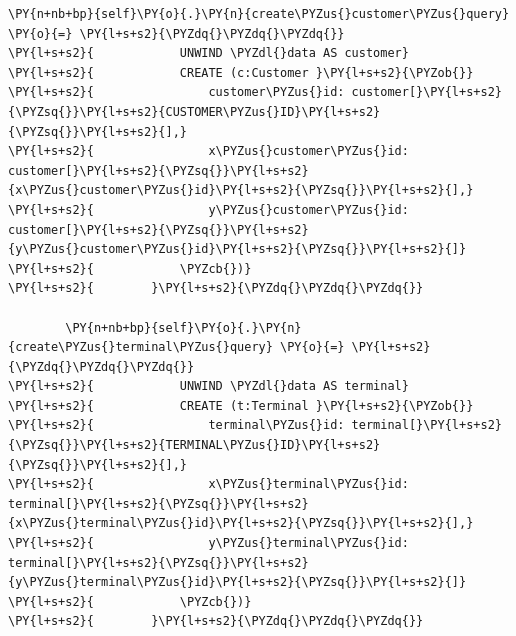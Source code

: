 \begin{tcolorbox}[breakable, size=fbox, boxrule=1pt, pad at break*=1mm,colback=cellbackground, colframe=cellborder]
\begin{Verbatim}[commandchars=\\\{\}]
        \PY{n+nb+bp}{self}\PY{o}{.}\PY{n}{create\PYZus{}customer\PYZus{}query} \PY{o}{=} \PY{l+s+s2}{\PYZdq{}\PYZdq{}\PYZdq{}}
\PY{l+s+s2}{            UNWIND \PYZdl{}data AS customer}
\PY{l+s+s2}{            CREATE (c:Customer }\PY{l+s+s2}{\PYZob{}}
\PY{l+s+s2}{                customer\PYZus{}id: customer[}\PY{l+s+s2}{\PYZsq{}}\PY{l+s+s2}{CUSTOMER\PYZus{}ID}\PY{l+s+s2}{\PYZsq{}}\PY{l+s+s2}{],}
\PY{l+s+s2}{                x\PYZus{}customer\PYZus{}id: customer[}\PY{l+s+s2}{\PYZsq{}}\PY{l+s+s2}{x\PYZus{}customer\PYZus{}id}\PY{l+s+s2}{\PYZsq{}}\PY{l+s+s2}{],}
\PY{l+s+s2}{                y\PYZus{}customer\PYZus{}id: customer[}\PY{l+s+s2}{\PYZsq{}}\PY{l+s+s2}{y\PYZus{}customer\PYZus{}id}\PY{l+s+s2}{\PYZsq{}}\PY{l+s+s2}{]}
\PY{l+s+s2}{            \PYZcb{})}
\PY{l+s+s2}{        }\PY{l+s+s2}{\PYZdq{}\PYZdq{}\PYZdq{}}
        
        \PY{n+nb+bp}{self}\PY{o}{.}\PY{n}{create\PYZus{}terminal\PYZus{}query} \PY{o}{=} \PY{l+s+s2}{\PYZdq{}\PYZdq{}\PYZdq{}}
\PY{l+s+s2}{            UNWIND \PYZdl{}data AS terminal}
\PY{l+s+s2}{            CREATE (t:Terminal }\PY{l+s+s2}{\PYZob{}}
\PY{l+s+s2}{                terminal\PYZus{}id: terminal[}\PY{l+s+s2}{\PYZsq{}}\PY{l+s+s2}{TERMINAL\PYZus{}ID}\PY{l+s+s2}{\PYZsq{}}\PY{l+s+s2}{],}
\PY{l+s+s2}{                x\PYZus{}terminal\PYZus{}id: terminal[}\PY{l+s+s2}{\PYZsq{}}\PY{l+s+s2}{x\PYZus{}terminal\PYZus{}id}\PY{l+s+s2}{\PYZsq{}}\PY{l+s+s2}{],}
\PY{l+s+s2}{                y\PYZus{}terminal\PYZus{}id: terminal[}\PY{l+s+s2}{\PYZsq{}}\PY{l+s+s2}{y\PYZus{}terminal\PYZus{}id}\PY{l+s+s2}{\PYZsq{}}\PY{l+s+s2}{]}
\PY{l+s+s2}{            \PYZcb{})}
\PY{l+s+s2}{        }\PY{l+s+s2}{\PYZdq{}\PYZdq{}\PYZdq{}}
        

\end{Verbatim}
\end{tcolorbox}
